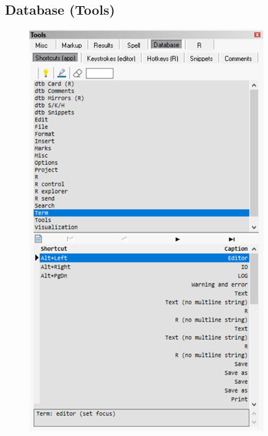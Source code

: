 \hypertarget{working_tools_database}{}
\subsection{Database (Tools)}

\begin{figure}[H]
  \includegraphics[scale=0.45]{./res/tools_database_shortcuts.png}~~

\end{figure}
